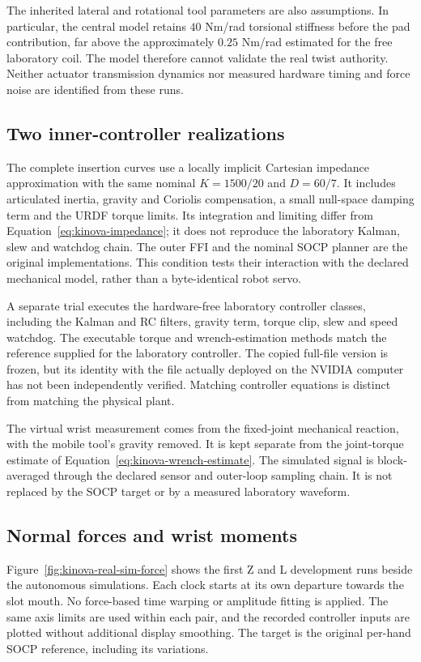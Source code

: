 The inherited lateral and rotational tool parameters are also assumptions. In particular, the central model retains $40$ Nm/rad torsional stiffness before the pad contribution, far above the approximately $0.25$ Nm/rad estimated for the free laboratory coil. The model therefore cannot validate the real twist authority. Neither actuator transmission dynamics nor measured hardware timing and force noise are identified from these runs.

\subsection{Two inner-controller realizations}

The complete insertion curves use a locally implicit Cartesian impedance approximation with the same nominal $K=1500/20$ and $D=60/7$. It includes articulated inertia, gravity and Coriolis compensation, a small null-space damping term and the URDF torque limits. Its integration and limiting differ from Equation~\eqref{eq:kinova-impedance}; it does not reproduce the laboratory Kalman, slew and watchdog chain. The outer FFI and the nominal SOCP planner are the original implementations. This condition tests their interaction with the declared mechanical model, rather than a byte-identical robot servo.

A separate trial executes the hardware-free laboratory controller classes, including the Kalman and RC filters, gravity term, torque clip, slew and speed watchdog. The executable torque and wrench-estimation methods match the reference supplied for the laboratory controller. The copied full-file version is frozen, but its identity with the file actually deployed on the NVIDIA computer has not been independently verified. Matching controller equations is distinct from matching the physical plant.

The virtual wrist measurement comes from the fixed-joint mechanical reaction, with the mobile tool's gravity removed. It is kept separate from the joint-torque estimate of Equation~\eqref{eq:kinova-wrench-estimate}. The simulated signal is block-averaged through the declared sensor and outer-loop sampling chain. It is not replaced by the SOCP target or by a measured laboratory waveform.

\subsection{Normal forces and wrist moments}

Figure~\ref{fig:kinova-real-sim-force} shows the first Z and L development runs beside the autonomous simulations. Each clock starts at its own departure towards the slot mouth. No force-based time warping or amplitude fitting is applied. The same axis limits are used within each pair, and the recorded controller inputs are plotted without additional display smoothing. The target is the original per-hand SOCP reference, including its variations.

